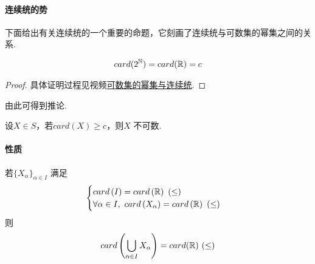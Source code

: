 \vspace*{2em}
\paragraph{连续统的势}
	下面给出有关连续统的一个重要的命题，它刻画了连续统与可数集的幂集之间的关系.
	\begin{proposition}\label{prop 1.8.1}
		\begin{align}
			card(2^{\mathbb{N}}) = card(\mathbb{R}) = c
		\end{align}
		\begin{proof}
			具体证明过程见视频\href{https://www.bilibili.com/video/BV1RX4y1R7Yc}{可数集的幂集与连续统}.
		\end{proof}
	\end{proposition}
	由此可得到推论.
	\begin{corollary}\label{cor 1.8.2}
		设$X \in S$，若$card(X) \geq c$，则$X$ 不可数.
	\end{corollary}

\vspace*{2em}
\paragraph{性质}
\begin{proposition}\label{prop 1.8.2}
	若$\{ X_\alpha \}_{\alpha \in I}$ 满足
	\begin{align}
		\begin{cases}
			card\left( I \right) =card\left( \mathbb{R} \right) \,\, (\leq)\\
			\forall \alpha \in I , \,\, card\left( X_{\alpha} \right) = card\left( \mathbb{R} \right) \,\, (\leq)
		\end{cases}
	\end{align}
	则
	\begin{align}
		card\left(\bigcup_{\alpha \in I}{X_\alpha}\right) = card(\mathbb{R}) \,\, (\leq)
	\end{align}
\end{proposition}

